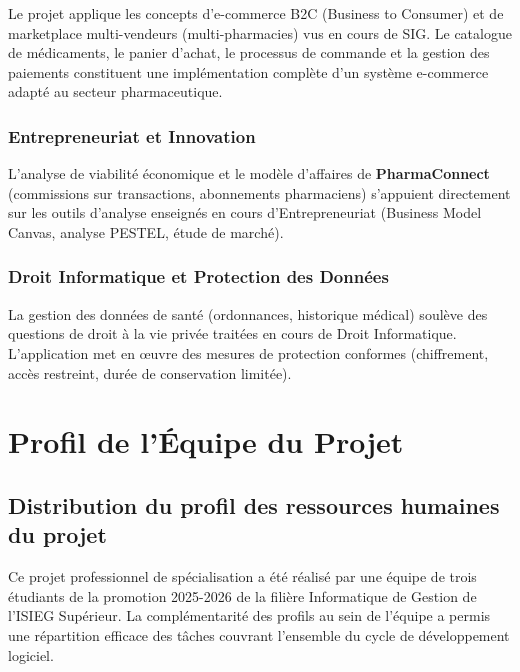 \documentclass[12pt,a4paper,oneside]{report}
\newcommand{\pharma}{\textcolor{vertpharma}{\textbf{PharmaConnect}}}
\begin{document}
Le projet applique les concepts d'e-commerce B2C (Business to Consumer) et de marketplace multi-vendeurs (multi-pharmacies) vus en cours de SIG. Le catalogue de médicaments, le panier d'achat, le processus de commande et la gestion des paiements constituent une implémentation complète d'un système e-commerce adapté au secteur pharmaceutique.

\subsection{Entrepreneuriat et Innovation}

L'analyse de viabilité économique et le modèle d'affaires de \pharma{} (commissions sur transactions, abonnements pharmaciens) s'appuient directement sur les outils d'analyse enseignés en cours d'Entrepreneuriat (Business Model Canvas, analyse PESTEL, étude de marché).

\subsection{Droit Informatique et Protection des Données}

La gestion des données de santé (ordonnances, historique médical) soulève des questions de droit à la vie privée traitées en cours de Droit Informatique. L'application met en œuvre des mesures de protection conformes (chiffrement, accès restreint, durée de conservation limitée).

\clearpage

\chapter{Profil de l'Équipe du Projet}

\section{Distribution du profil des ressources humaines du projet}

Ce projet professionnel de spécialisation a été réalisé par une équipe de trois étudiants de la promotion 2025-2026 de la filière Informatique de Gestion de l'ISIEG Supérieur. La complémentarité des profils au sein de l'équipe a permis une répartition efficace des tâches couvrant l'ensemble du cycle de développement logiciel.
\end{document}
